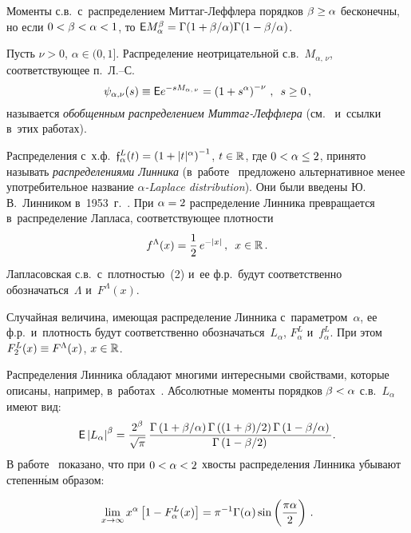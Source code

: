 \begin{multicols}{2}
Моменты с.в.\ с~распределением Мит\-таг-Леф\-фле\-ра порядков
$\beta\hm\ge\alpha$ бесконечны, но если $0\hm<\beta\hm<\alpha\hm<1$, то ${\sf E}
M_{\alpha}^{\beta}\hm={\Gamma(1\hm+{\beta}/{\alpha})\Gamma(1\hm-{\beta}/{\alpha})}$.

Пусть $\nu>0$, $\alpha\in(0,1]$. Распределение неотрицательной с.в.\
$M_{\alpha,\,\nu}$, соответствующее п.~Л.--С.
$$
\psi_{\alpha,\nu}(s)\equiv {\sf E}
e^{-sM_{\alpha,\,\nu}}=\left(1+s^{\alpha}\right)^{-\nu}\,,\enskip s\ge0\,,
$$
называется \textit{обобщенным распределением Мит\-таг-Леф\-фле\-ра} 
(см.~\cite{MathaiHaubold2011, Joseetal} и~ссылки в~этих работах).

Распределения с~х.ф.~$\mathfrak{f}^{L}_{\alpha}(t)\hm=\left(1\hm+|t|^{\alpha}\right)^{-1}$,
$t\hm\in\mathbb{R}$, где $0\hm<\alpha\hm\le2$, принято называть 
\textit{распределениями Линника} (в~работе~\cite{Pillai1985} предложено
альтернативное менее употребительное название \textit{$\alpha$-Laplace
distribution}). Они были введены Ю.\,В.~Линником в~1953~г.~\cite{Linnik1953}. 
При $\alpha\hm=2$ распределение Линника
превращается в~распределение Лапласа, соответствующее плотности
\begin{equation}
f^{\Lambda}(x)=\displaystyle\frac{\displaystyle 1\mathstrut}{\displaystyle 2\mathstrut}\,e^{-|x|}\,,\enskip
x\in\mathbb{R}\,.
\label{e2-kgz}
\end{equation}
Лапласовская с.в.\ с~плотностью~(2) и~ее ф.р.\ будут соответственно
обозначаться~$\Lambda$ и~$F^{\Lambda}(x)$.

Случайная величина, имеющая распределение Линника с~параметром~$\alpha$, ее ф.р.\
и~плот\-ность будут соответственно обозначаться~$L_{\alpha}$,
$F_{\alpha}^{L}$ и~$f_{\alpha}^{L}$. При этом $F_2^{L}(x)\hm\equiv
F^{\Lambda}(x)$, $x\hm\in\mathbb{R}$.

Распределения Линника обладают многими интересными свойствами,
которые описаны, например, в~работах~\cite{KotzOstrovskiiHayfavi1995a,
KotzOstrovskiiHayfavi1995b, Lin1994, Anderson1992, Devroye1990}.
Абсолютные моменты порядков $\beta\hm<\alpha$ с.в.~$L_{\alpha}$ имеют
вид:
$$
{\sf E}\left\vert L_{\alpha}\right\vert^{\beta}=
\displaystyle\frac{\displaystyle 2^{\beta}\mathstrut}{\displaystyle \sqrt{\pi}\mathstrut}\,\displaystyle\frac{\displaystyle \Gamma\left(1+{\beta}/{\alpha}\right)
\Gamma\left(({1+\beta})/{2}\right)\Gamma\left(1-{\beta}/{\alpha}\right)\mathstrut}{\displaystyle \Gamma\left(1-{\beta}/{2}\right)\mathstrut}.
$$
В работе~\cite{Jacquesetal1999} показано, что при $0\hm<\alpha\hm<2$
хвосты распределения Линника убывают степенн$\acute{\mbox{ы}}$м образом:

\noindent
$$
\lim\limits_{x\to\infty}x^{\alpha}\left[1-F^{L}_{\alpha}(x)\right]=
\pi^{-1}\Gamma(\alpha)\sin\left(\displaystyle\frac{\displaystyle \pi\alpha\mathstrut}{\displaystyle 2\mathstrut}\right)\,.
$$



\end{multicols}

